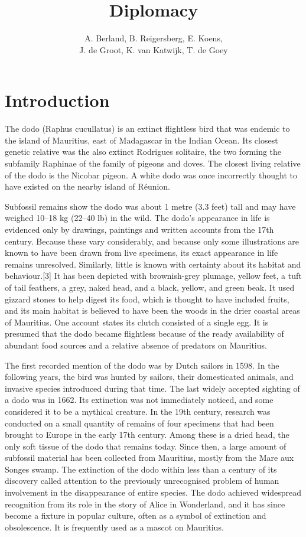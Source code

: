 \documentclass[a4paper]{article} %
\title{Diplomacy}
\author{A. Berland, B. Reigersberg, E. Koens, \\J. de Groot, K. van Katwijk, T. de Goey}
\begin{document}
\maketitle
\tableofcontents
\newpage

\section{Introduction}

The dodo (Raphus cucullatus) is an extinct flightless bird that was endemic to the island of Mauritius, east of Madagascar in the Indian Ocean. Its closest genetic relative was the also extinct Rodrigues solitaire, the two forming the subfamily Raphinae of the family of pigeons and doves. The closest living relative of the dodo is the Nicobar pigeon. A white dodo was once incorrectly thought to have existed on the nearby island of Réunion.

Subfossil remains show the dodo was about 1 metre (3.3 feet) tall and may have weighed 10–18 kg (22–40 lb) in the wild. The dodo's appearance in life is evidenced only by drawings, paintings and written accounts from the 17th century. Because these vary considerably, and because only some illustrations are known to have been drawn from live specimens, its exact appearance in life remains unresolved. Similarly, little is known with certainty about its habitat and behaviour.[3] It has been depicted with brownish-grey plumage, yellow feet, a tuft of tail feathers, a grey, naked head, and a black, yellow, and green beak. It used gizzard stones to help digest its food, which is thought to have included fruits, and its main habitat is believed to have been the woods in the drier coastal areas of Mauritius. One account states its clutch consisted of a single egg. It is presumed that the dodo became flightless because of the ready availability of abundant food sources and a relative absence of predators on Mauritius.

The first recorded mention of the dodo was by Dutch sailors in 1598. In the following years, the bird was hunted by sailors, their domesticated animals, and invasive species introduced during that time. The last widely accepted sighting of a dodo was in 1662. Its extinction was not immediately noticed, and some considered it to be a mythical creature. In the 19th century, research was conducted on a small quantity of remains of four specimens that had been brought to Europe in the early 17th century. Among these is a dried head, the only soft tissue of the dodo that remains today. Since then, a large amount of subfossil material has been collected from Mauritius, mostly from the Mare aux Songes swamp. The extinction of the dodo within less than a century of its discovery called attention to the previously unrecognised problem of human involvement in the disappearance of entire species. The dodo achieved widespread recognition from its role in the story of Alice in Wonderland, and it has since become a fixture in popular culture, often as a symbol of extinction and obsolescence. It is frequently used as a mascot on Mauritius.




{}
\end{document}
